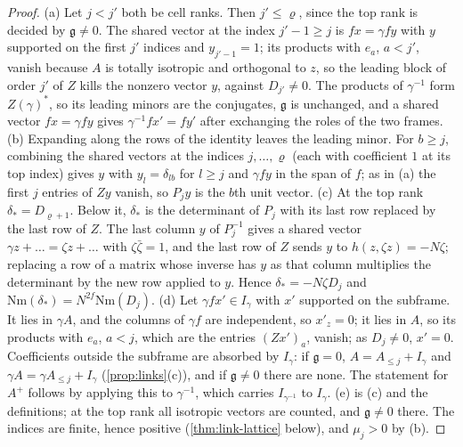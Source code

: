 \begin{proof}
(a) Let $j<j'$ both be cell ranks. Then $j'\le\varrho$, since the top rank is decided by $\mathfrak g\ne0$. The shared vector at the index $j'-1\ge j$ is $fx=\gamma fy$ with $y$ supported on the first $j'$ indices and
$y_{j'-1}=1$; its products with $e_a$, $a<j'$, vanish because $A$ is totally isotropic and orthogonal to $z$, so the leading block of order $j'$ of $Z$ kills the nonzero vector $y$, against $D_{j'}\ne0$. The
products of $\gamma^{-1}$ form $Z(\gamma)^*$, so its leading minors are the conjugates, $\mathfrak g$ is unchanged, and a shared vector $fx=\gamma fy$ gives $\gamma^{-1}fx'=fy'$ after exchanging the roles of the two frames.
(b) Expanding along the rows of the identity leaves the leading minor. For $b\ge j$, combining the shared vectors at the indices $j,\dots,\varrho$ (each with coefficient $1$ at its top index) gives $y$ with
$y_l=\delta_{lb}$ for $l\ge j$ and $\gamma fy$ in the span of $f$; as in (a) the first $j$ entries of $Zy$ vanish, so $P_jy$ is the $b$th unit vector.
(c) At the top rank $\delta_*=D_{\varrho+1}$. Below it, $\delta_*$ is the determinant of $P_j$ with its last row replaced by the last row of $Z$. The last column $y$ of $P_j^{-1}$ gives a shared vector
$\gamma z+\dots=\zeta z+\dots$ with $\zeta\bar\zeta=1$, and the last row of $Z$ sends $y$ to $h(z,\zeta z)=-N\zeta$; replacing a row of a matrix whose inverse has $y$ as that column multiplies the determinant by the new row
applied to $y$. Hence $\delta_*=-N\zeta D_j$ and $\mathrm{Nm}(\delta_*)=N^{2f}\mathrm{Nm}(D_j)$.
(d) Let $\gamma fx'\in I_\gamma$ with $x'$ supported on the subframe. It lies in $\gamma A$, and the columns of $\gamma f$ are independent, so $x'_z=0$; it lies in $A$, so its products with $e_a$, $a<j$, which are the
entries $(Zx')_a$, vanish; as $D_j\ne0$, $x'=0$. Coefficients outside the subframe are absorbed by $I_\gamma$: if $\mathfrak g=0$, $A=A_{\le j}+I_\gamma$ and $\gamma A=\gamma A_{\le j}+I_\gamma$ (\cref{prop:links}(c)), and if
$\mathfrak g\ne0$ there are none. The statement for $A^+$ follows by applying this to $\gamma^{-1}$, which carries $I_{\gamma^{-1}}$ to $I_\gamma$.
(e) is (c) and the definitions; at the top rank all isotropic vectors are counted, and $\mathfrak g\ne0$ there. The indices are finite, hence positive (\cref{thm:link-lattice} below), and $\mu_j>0$ by (b).
\end{proof}

